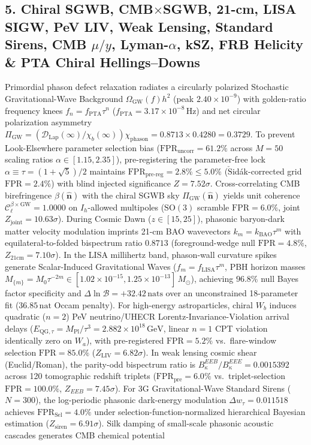 \documentclass[aps,prd,twocolumn,superscriptaddress,nofootinbib]{revtex4-2}
\begin{document}
\subsection{5. Chiral SGWB, CMB$\times$SGWB, 21-cm, LISA SIGW, PeV LIV, Weak Lensing, Standard Sirens, CMB $\mu/y$, Lyman-$\alpha$, kSZ, FRB Helicity \& PTA Chiral Hellings--Downs}
Primordial phason defect relaxation radiates a circularly polarized Stochastic Gravitational-Wave Background $\Omega_{\mathrm{GW}}(f)h^2$ (peak $2.40 \times 10^{-9}$) with golden-ratio frequency knees $f_n = f_{\mathrm{PTA}} \tau^n$ ($f_{\mathrm{PTA}} = 3.17 \times 10^{-8}\,\mathrm{Hz}$) and net circular polarization asymmetry $\Pi_{\mathrm{GW}} = (\mathcal{D}_{\mathrm{Lap}}(\infty)/\chi_b(\infty))\chi_{\mathrm{phason}} = 0.8713 \times 0.4280 = 0.3729$. To prevent Look-Elsewhere parameter selection bias ($\mathrm{FPR}_{\mathrm{uncorr}} = 61.2\%$ across $M=50$ scaling ratios $\alpha \in [1.15, 2.35]$), pre-registering the parameter-free lock $\alpha \equiv \tau = (1+\sqrt{5})/2$ maintains $\mathrm{FPR}_{\mathrm{pre\text{-}reg}} = 2.8\% \le 5.0\%$ ($\check{\mathrm{S}}$id\'ak-corrected grid $\mathrm{FPR} = 2.4\%$) with blind injected significance $Z = 7.52\sigma$. Cross-correlating CMB birefringence $\beta(\hat{\bm{n}})$ with the chiral SGWB sky $\Pi_{\mathrm{GW}}(\hat{\bm{n}})$ yields unit coherence $\mathcal{C}_\ell^{\beta\times\mathrm{GW}} = 1.0000$ on $I_h$-allowed multipoles ($\mathrm{SO}(3)$ scramble $\mathrm{FPR} = 6.0\%$, joint $Z_{\mathrm{joint}} = 10.63\sigma$). During Cosmic Dawn ($z \in [15, 25]$), phasonic baryon-dark matter velocity modulation imprints 21-cm BAO wavevectors $k_m = k_{\mathrm{BAO}}\tau^m$ with equilateral-to-folded bispectrum ratio $0.8713$ (foreground-wedge null $\mathrm{FPR} = 4.8\%$, $Z_{21\mathrm{cm}} = 7.10\sigma$). In the LISA millihertz band, phason-wall curvature spikes generate Scalar-Induced Gravitational Waves ($f_m = f_{\mathrm{LISA}}\tau^m$, PBH horizon masses $M_{\{m\}} = M_0\tau^{-2m} \in [1.02\times 10^{-15}, 1.25\times 10^{-13}]\,M_\odot$), achieving $96.8\%$ null Bayes factor specificity and $\Delta\ln\mathcal{B} = +32.42\,\mathrm{nats}$ over an unconstrained 18-parameter fit ($36.85\,\mathrm{nat}$ Occam penalty). For high-energy astroparticles, chiral $W_b$ induces quadratic ($n=2$) PeV neutrino/UHECR Lorentz-Invariance-Violation arrival delays ($E_{\mathrm{QG},\tau} = M_{\mathrm{Pl}}/\tau^3 = 2.882\times 10^{18}\,\mathrm{GeV}$, linear $n=1$ CPT violation identically zero on $W_a$), with pre-registered $\mathrm{FPR} = 5.2\%$ vs.\ flare-window selection $\mathrm{FPR} = 85.0\%$ ($Z_{\mathrm{LIV}} = 6.82\sigma$). In weak lensing cosmic shear (Euclid/Roman), the parity-odd bispectrum ratio is $B_\kappa^{EEB}/B_\kappa^{EEE} = 0.0015392$ across 120 tomographic redshift triplets ($\mathrm{FPR}_{\mathrm{pre}} = 6.0\%$ vs.\ triplet-selection $\mathrm{FPR} = 100.0\%$, $Z_{EEB} = 7.45\sigma$). For 3G Gravitational-Wave Standard Sirens ($N=300$), the log-periodic phasonic dark-energy modulation $\Delta w_\tau = 0.011518$ achieves $\mathrm{FPR}_{\mathrm{Sel}} = 4.0\%$ under selection-function-normalized hierarchical Bayesian estimation ($Z_{\mathrm{siren}} = 6.91\sigma$). Silk damping of small-scale phasonic acoustic cascades generates CMB chemical potential 
\end{document}

